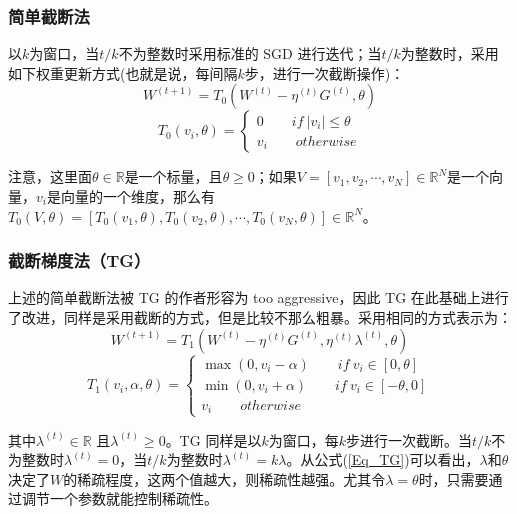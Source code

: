 \documentclass[12pt]{article}
\begin{document}
\subsubsection{简单截断法}
以$k$为窗口，当$t/k$不为整数时采用标准的 SGD 进行迭代；当$t/k$为整数时，采用如下权重更新方式(也就是说，每间隔$k$步，进行一次截断操作)：
$$
W^{(t+1)} = T_0(W^{(t)} - \eta^{(t)}G^{(t)}, \theta)
$$
\begin{equation}
T_0(v_i, \theta) = \begin{cases}
0 \qquad if \ |v_i| \le \theta \\
v_i \qquad otherwise
\end{cases} \label{Eq_Simple_Truancate}
\end{equation}


注意，这里面$\theta \in \mathbb{R}$是一个标量，且$\theta \ge 0$；如果$V = [v_1, v_2, \cdots, v_N] \in \mathbb{R}^N$是一个向量，$v_i$是向量的一个维度，那么有$T_0(V, \theta) = [T_0(v_1,\theta), T_0(v_2, \theta), \cdots, T_0(v_N, \theta)] \in \mathbb{R}^N$。

\subsubsection{截断梯度法（TG）}
上述的简单截断法被 TG 的作者形容为 too aggressive，因此 TG 在此基础上进行了改进，同样是采用截断的方式，但是比较不那么粗暴。采用相同的方式表示为：
$$
W^{(t+1)} = T_1(W^{(t)} - \eta^{(t)}G^{(t)}, \eta^{(t)}\lambda^{(t)}, \theta)
$$
\begin{equation}
T_1(v_i, \alpha, \theta) = \begin{cases}
\max(0, v_i - \alpha) \qquad if \ v_i \in [0, \theta] \\
\min(0, v_i + \alpha) \qquad if \ v_i \in [-\theta, 0] \\
v_i \qquad otherwise
\end{cases} \label{Eq_TG}
\end{equation}

其中$\lambda^{(t)} \in \mathbb{R}$ 且$\lambda^{(t)} \ge 0$。TG 同样是以$k$为窗口，每$k$步进行一次截断。当$t/k$不为整数时$\lambda^{(t)} = 0$，当$t/k$为整数时$\lambda^{(t)} = k\lambda$。从公式(\ref{Eq_TG})可以看出，$\lambda$和$\theta$决定了$W$的稀疏程度，这两个值越大，则稀疏性越强。尤其令$\lambda = \theta$时，只需要通过调节一个参数就能控制稀疏性。
\end{document}

